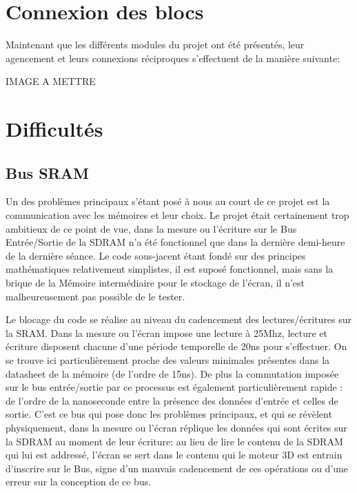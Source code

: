 \documentclass[10pt,a4paper]{report}
\begin{document}
\chapter{Connexion des blocs}

Maintenant que les différents modules du projet ont été présentés, leur agencement et leurs connexions réciproques s'effectuent de la manière suivante:

IMAGE A METTRE 

\chapter{Difficultés}

\section{Bus SRAM}
Un des problèmes principaux s'étant posé à nous au court de ce projet est la communication avec les mémoires et leur choix. Le projet était certainement trop ambitieux de ce point de vue, dans la mesure ou l'écriture sur le Bus Entrée/Sortie de la SDRAM n'a été fonctionnel que dans la dernière demi-heure de la dernière séance. Le code sous-jacent étant fondé sur des principes mathématiques relativement simplistes, il est suposé fonctionnel, mais sans la brique de la Mémoire intermédiaire pour le stockage de l'écran, il n'est malheureusement pas possible de le tester.

Le blocage du code se réalise au niveau du cadencement des lectures/écritures sur la SRAM. Dans la mesure ou l'écran impose une lecture à 25Mhz, lecture et écriture disposent chacune d'une période temporelle de 20ns pour s'effectuer. On se trouve ici particulièrement proche des valeurs minimales présentes dans la datasheet de la mémoire (de l'ordre de 15ns). De plus la commutation imposée sur le bus entrée/sortie par ce processus est également particulièrement rapide : de l'ordre de la nanoseconde entre la présence des données d'entrée et celles de sortie. C'est ce bus qui pose donc les problèmes principaux, et qui se révèlent physiquement, dans la mesure ou l'écran réplique les données qui sont écrites sur la SDRAM au moment de leur écriture: au lieu de lire le contenu de la SDRAM qui lui est addressé, l'écran se sert dans le contenu qui le moteur 3D est entrain d'inscrire sur le Bus, signe d'un mauvais cadencement de ces opérations ou d'une erreur sur la conception de ce bus.
\end{document}
